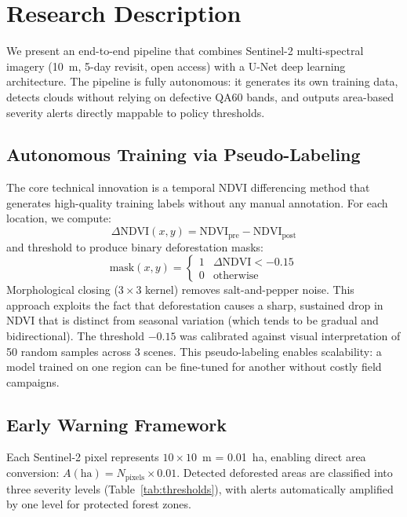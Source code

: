 \documentclass[10pt,a4paper,onecolumn]{article}
\begin{document}
\section{Research Description}
We present an end-to-end pipeline that combines Sentinel-2
multi-spectral imagery (10~m, 5-day revisit, open access) with a
U-Net deep learning architecture. The pipeline is fully autonomous:
it generates its own training data, detects clouds without relying
on defective QA60 bands, and outputs area-based severity alerts
directly mappable to policy thresholds.

\subsection{Autonomous Training via Pseudo-Labeling}
The core technical innovation is a temporal NDVI differencing
method that generates high-quality training labels without any
manual annotation. For each location, we compute:
\begin{equation}
\Delta\text{NDVI}(x,y) = \text{NDVI}_{\text{pre}} - \text{NDVI}_{\text{post}}
\end{equation}
and threshold to produce binary deforestation masks:
\begin{equation}
\text{mask}(x,y) = 
\begin{cases}
1 & \Delta\text{NDVI} < -0.15 \\
0 & \text{otherwise}
\end{cases}
\end{equation}
Morphological closing ($3\times3$ kernel) removes salt-and-pepper
noise. This approach exploits the fact that deforestation causes
a sharp, sustained drop in NDVI that is distinct from seasonal
variation (which tends to be gradual and bidirectional). The
threshold $-0.15$ was calibrated against visual interpretation of
50 random samples across 3 scenes. This pseudo-labeling enables
scalability: a model trained on one region can be fine-tuned for
another without costly field campaigns.

\subsection{Early Warning Framework}
Each Sentinel-2 pixel represents $10\times10$~m = 0.01~ha, enabling
direct area conversion: $A(\text{ha}) = N_{\text{pixels}} \times 0.01$.
Detected deforested areas are classified into three severity levels
(Table~\ref{tab:thresholds}), with alerts automatically amplified
by one level for protected forest zones.
\end{document}
